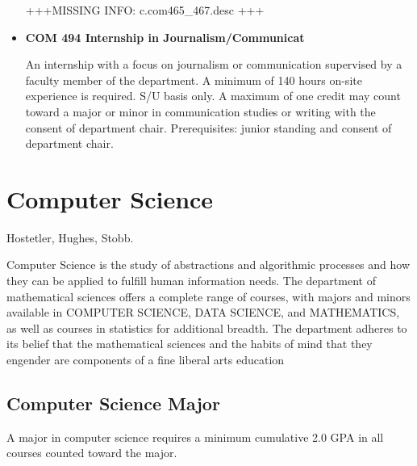 \documentclass[
  letterpaper,
]{scrbook}
\begin{document}
\begin{itemize}
  +++MISSING INFO: c.com465\_467.desc +++
\item
  \textbf{COM 494 Internship in Journalism/Communicat}

  An internship with a focus on journalism or communication supervised
  by a faculty member of the department. A minimum of 140 hours on-site
  experience is required. S/U basis only. A maximum of one credit may
  count toward a major or minor in communication studies or writing with
  the consent of department chair. Prerequisites: junior standing and
  consent of department chair.
\end{itemize}

\section{Computer Science}\label{computer-science}

Hostetler, Hughes, Stobb.

Computer Science is the study of abstractions and algorithmic processes
and how they can be applied to fulfill human information needs. The
department of mathematical sciences offers a complete range of courses,
with majors and minors available in COMPUTER SCIENCE, DATA SCIENCE, and
MATHEMATICS, as well as courses in statistics for additional breadth.
The department adheres to its belief that the mathematical sciences and
the habits of mind that they engender are components of a fine liberal
arts education

\subsection{Computer Science Major}\label{computer-science-major}

A major in computer science requires a minimum cumulative 2.0 GPA in all
courses counted toward the major.
\end{document}
